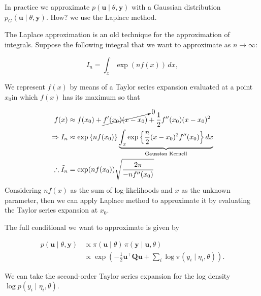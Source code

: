 \documentclass[
  letterpaper,
  DIV=11,
  numbers=noendperiod]{scrartcl}
\begin{document}
In practice we approximate \(p(\mathbf{u}\mid \theta, \mathbf{y})\) with
a Gaussian distribution \(p_G(\mathbf{u}\mid \theta, \mathbf{y})\). How?
we use the Laplace method.

\begin{tcolorbox}[enhanced jigsaw, titlerule=0mm, colframe=quarto-callout-note-color-frame, bottomtitle=1mm, left=2mm, bottomrule=.15mm, breakable, opacitybacktitle=0.6, leftrule=.75mm, opacityback=0, rightrule=.15mm, toptitle=1mm, title=\textcolor{quarto-callout-note-color}{\faInfo}\hspace{0.5em}{Laplace approximation}, colbacktitle=quarto-callout-note-color!10!white, colback=white, toprule=.15mm, arc=.35mm, coltitle=black]

The Laplace approximation is an old technique for the approximation of
integrals. Suppose the following integral that we want to approximate as
\(n \to \infty\):

\[
 I_n = \int_x \exp(n f(x))\,dx,
\]

We represent \(f(x)\) by means of a Taylor series expansion evaluated at
a point \(x_0\)in which \(f(x)\) has its maximum so that

\[
\begin{aligned}
f(x) &\approx f(x_0) + \cancelto{0}{f'(x_0)(x-x_0)} + \frac{1}{2}f''(x_0)(x-x_0)^2 \\
\Rightarrow I_n &\approx \exp\left\{n f(x_0)\right\} \underbrace{\int_x\exp\left\{\frac{n}{2} (x-x_0)^2f''(x_0) \right\}dx}_{\text{Gaussian Kernell}}\\
\therefore \tilde{I}_n &= \exp(n f(x_0))
 \sqrt{\frac{2\pi}{-n f''(x_0)}}
\end{aligned}
\] Considering \(nf(x)\) as the sum of log-likelihoods and \(x\) as the
unknown parameter, then we can apply Laplace method to approximate it by
evaluating the Taylor series expansion at \(x_0\).

\end{tcolorbox}

The full conditional we want to approximate is given by

\[
\begin{aligned}
p(\mathbf{u}\mid \theta, \mathbf{y}) &\propto \pi(\mathbf{u} \mid \theta)\,\pi(\mathbf{y} \mid \mathbf{u}, \theta) \\
&\propto
\exp\!\left(
-\frac{1}{2}\mathbf{u}^\top \mathbf{Q} \mathbf{u}
+
\sum_i \log \pi(y_i \mid \eta_i, \theta)
\right).
\end{aligned}
\]

We can take the second-order Taylor series expansion for the log density
\(\log p(y_i\mid \eta_i,\theta)\).
\end{document}
